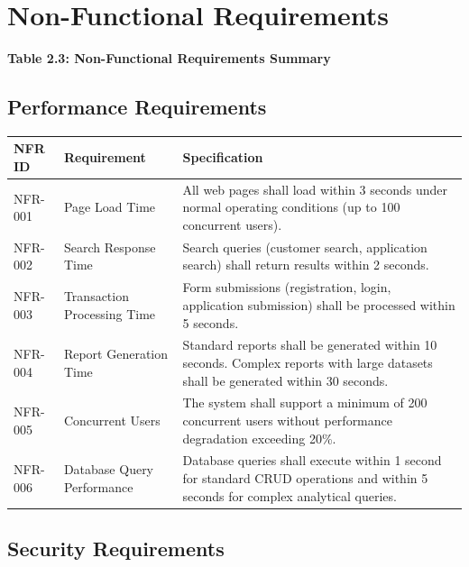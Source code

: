 \documentclass[12pt,a4paper,oneside]{report}
\begin{document}
\section{Non-Functional Requirements}

\textbf{Table 2.3: Non-Functional Requirements Summary}

\subsection{Performance Requirements}

\begin{table}[htbp]
\centering
\small
\begin{tabularx}{\textwidth}{l l X}
\toprule
\textbf{NFR ID} & \textbf{Requirement} & \textbf{Specification} \\
\midrule
NFR-001 & Page Load Time & All web pages shall load within 3 seconds under normal operating conditions (up to 100 concurrent users). \\
NFR-002 & Search Response Time & Search queries (customer search, application search) shall return results within 2 seconds. \\
NFR-003 & Transaction Processing Time & Form submissions (registration, login, application submission) shall be processed within 5 seconds. \\
NFR-004 & Report Generation Time & Standard reports shall be generated within 10 seconds. Complex reports with large datasets shall be generated within 30 seconds. \\
NFR-005 & Concurrent Users & The system shall support a minimum of 200 concurrent users without performance degradation exceeding 20\%. \\
NFR-006 & Database Query Performance & Database queries shall execute within 1 second for standard CRUD operations and within 5 seconds for complex analytical queries. \\
\bottomrule
\end{tabularx}
\end{table}

\subsection{Security Requirements}
\end{document}
